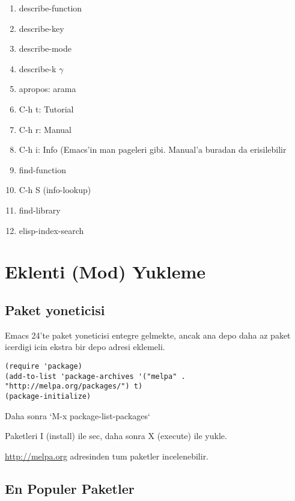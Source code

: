 \documentclass[11pt]{article}
\begin{document}
\begin{enumerate}
\item describe-function
\item describe-key
\item describe-mode
\item describe-k $\gamma$
\item apropos: arama

\item C-h t: Tutorial
\item C-h r: Manual
\item C-h i: Info (Emacs'in man pageleri gibi. Manual'a buradan da erisilebilir

\item find-function
\item C-h S (info-lookup)
\item find-library
\item elisp-index-search
\end{enumerate}

\section{Eklenti (Mod) Yukleme}
\label{sec-4}

\subsection{Paket yoneticisi}
\label{sec-4-1}

Emacs 24'te paket yoneticisi entegre gelmekte, ancak ana depo daha az
paket icerdigi icin ekstra bir depo adresi eklemeli.
\begin{verbatim}
(require 'package)
(add-to-list 'package-archives '("melpa" . "http://melpa.org/packages/") t)
(package-initialize)
\end{verbatim}

Daha sonra `M-x package-list-packages`

Paketleri I (install) ile sec, daha sonra X (execute) ile yukle.

\url{http://melpa.org} adresinden tum paketler incelenebilir.

\subsection{En Populer Paketler}
\label{sec-4-2}
\end{document}
